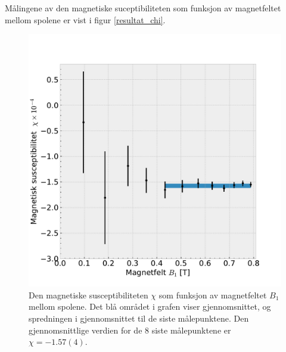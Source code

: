 \documentclass[%
 reprint,
 amsmath,amssymb,
 aps,
]{revtex4-1}
\begin{document}
Målingene av den magnetiske suceptibiliteten som funksjon av magnetfeltet mellom spolene er vist i figur \vref{resultat_chi}.
\begin{figure}[h!]
  \centering
  \includegraphics[scale=0.5]{chi_effekt.pdf}
  \caption{Den magnetiske susceptibiliteten $\chi$ som funksjon av magnetfeltet $B_1$ mellom spolene. Det blå området i grafen viser gjennomsnittet, og spredningen i gjennomsnittet til de siste målepunktene. Den gjennomsnittlige verdien for de $8$ siste målepunktene er $\chi = -1.57(4)$.}
  \label{resultat_chi}
\end{figure}
\end{document}
